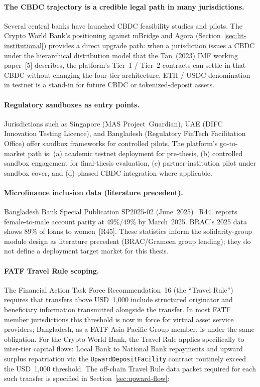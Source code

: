 \documentclass[12pt,a4paper]{report}
\begin{document}
\paragraph{The CBDC trajectory is a credible legal path in many jurisdictions.}
Several central banks have launched CBDC feasibility studies and pilots. The Crypto World Bank's positioning against mBridge and Agora (Section~\ref{sec:lit-institutional}) provides a direct upgrade path: when a jurisdiction issues a CBDC under the hierarchical distribution model that the Tan~(2023) IMF working paper~[5] describes, the platform's Tier~1 / Tier~2 contracts can settle in that CBDC without changing the four-tier architecture. ETH / USDC denomination in testnet is a stand-in for future CBDC or tokenized-deposit assets.

\paragraph{Regulatory sandboxes as entry points.}
Jurisdictions such as Singapore (MAS Project~Guardian), UAE (DIFC Innovation Testing Licence), and Bangladesh (Regulatory FinTech Facilitation Office) offer sandbox frameworks for controlled pilots. The platform's go-to-market path is: (a) academic testnet deployment for pre-thesis, (b) controlled sandbox engagement for final-thesis evaluation, (c) partner-institution pilot under sandbox cover, and (d) phased CBDC integration where applicable.

\paragraph{Microfinance inclusion data (literature precedent).}
Bangladesh Bank Special Publication SP2025-02 (June~2025)~[R44] reports female-to-male account parity at 49\%/49\% by March~2025. BRAC's 2025 data shows 89\% of loans to women~[R45]. These statistics inform the solidarity-group module design as literature precedent (BRAC/Grameen group lending); they do not define a deployment target market for this thesis.

\paragraph{FATF Travel Rule scoping.}
The Financial Action Task Force Recommendation~16 (the ``Travel Rule'') requires that transfers above USD~1{,}000 include structured originator and beneficiary information transmitted alongside the transfer. In most FATF member jurisdictions this threshold is now in force for virtual asset service providers; Bangladesh, as a FATF Asia-Pacific Group member, is under the same obligation. For the Crypto World Bank, the Travel Rule applies specifically to inter-tier capital flows: Local Bank to National Bank repayments and upward surplus repatriation via the \texttt{UpwardDepositFacility} contract routinely exceed the USD~1{,}000 threshold. The off-chain Travel Rule data packet required for each such transfer is specified in Section~\ref{sec:upward-flow}:
\end{document}
